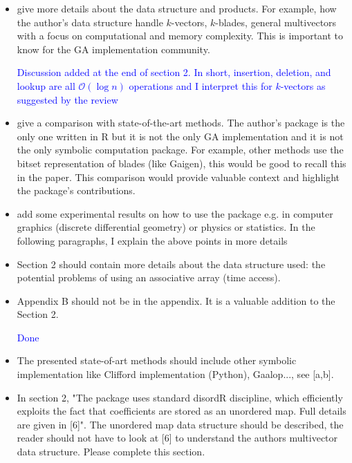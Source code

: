 \documentclass{article}
\begin{document}
\begin{itemize}
\item give more details about the data structure and products.  For
  example, how the author's data structure handle $k$-vectors,
  $k$-blades, general multivectors with a focus on computational and
  memory complexity.  This is important to know for the GA
  implementation community.

\textcolor{blue}{Discussion added at the end of section 2.  In short,
  insertion, deletion, and lookup are all $\mathcal{O}(\log n)$
  operations and I interpret this for $k$-vectors as suggested by the
  review}

\item give a comparison with state-of-the-art methods.  The author's
  package is the only one written in R but it is not the only GA
  implementation and it is not the only symbolic computation
  package.  For example, other methods use the bitset representation of
  blades (like Gaigen), this would be good to recall this in the
  paper.  This comparison would provide valuable context and highlight
  the package's contributions.
  
\item add some experimental results on how to use the package e.g. in
  computer graphics (discrete differential geometry) or physics or
  statistics.  In the following paragraphs, I explain the above points
  in more details

\item Section 2 should contain more details about the data structure
  used: the potential problems of using an associative array (time
  access).

\item Appendix B should not be in the appendix.  It is a valuable
  addition to the Section 2.

  \textcolor{blue}{Done}
  
\item The presented state-of-art methods should include other symbolic
  implementation like Clifford implementation (Python), Gaalop..., see
  [a,b].

\item In section 2, "The package uses standard disordR discipline,
  which efficiently exploits the fact that coefficients are stored as
  an unordered map.  Full details are given in [6]".  The unordered
  map data structure should be described, the reader should not have
  to look at [6] to understand the authors multivector data
  structure. Please complete this section.


\end{itemize}
\end{document}

